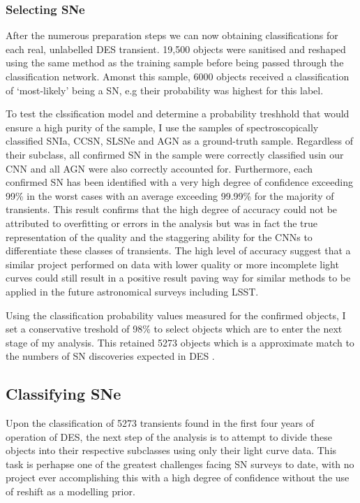 \subsubsection{Selecting SNe}
After the numerous preparation steps we can now obtaining classifications for each real, unlabelled DES transient. 19,500 objects were sanitised and reshaped using the same method as the training sample before being passed through the classification network. Amonst this sample, 6000 objects received a classification of `most-likely' being a SN, e.g their probability was highest for this label.

To test the clssification model and determine a probability treshhold that would ensure a high purity of the sample, I use the samples of spectroscopically classified SNIa, CCSN, SLSNe and AGN as a ground-truth sample. Regardless of their subclass, all confirmed SN in the sample were correctly classified usin our CNN and all AGN were also correctly accounted for. Furthermore, each confirmed SN has been identified with a very high degree of confidence exceeding 99\% in the worst cases with an average exceeding 99.99\% for the majority of transients. This result confirms that the high degree of accuracy could not be attributed to overfitting or errors in the analysis but was in fact the true representation of the quality and the staggering ability for the CNNs to differentiate these classes of transients. The high level of accuracy suggest that a similar project performed on data with lower quality or more incomplete light curves could still result in a positive result paving way for similar methods to be applied in the future astronomical surveys including LSST.

Using the classification probability values measured for the confirmed objects, I set a conservative treshold of 98\% to select objects which are to enter the next stage of my analysis. This retained 5273 objects which is a approximate match to the numbers of SN discoveries expected in DES \citep{Bernstein2012}.

\subsection{Classifying SNe}
Upon the classification of 5273 transients found in the first four years of operation of DES, the next step of the analysis is to attempt to divide these objects into their respective subclasses using only their light curve data. This task is perhapse one of the greatest challenges facing SN surveys to date, with no project ever accomplishing this with a high degree of confidence without the use of reshift as a modelling prior.

